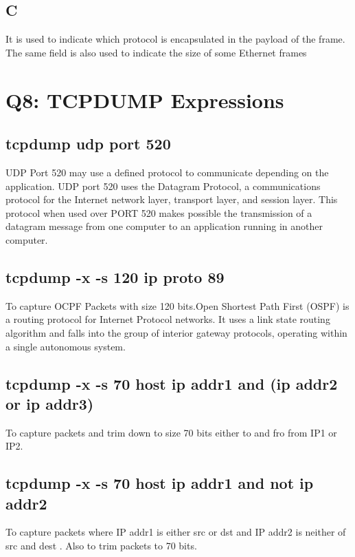 \documentclass{article}
\begin{document}
\subsection{C}
It is used to indicate which protocol is encapsulated in the payload of the frame. The same field is also used to indicate the size of some Ethernet frames

\section{Q8: TCPDUMP Expressions}
\subsection{tcpdump udp port 520}
UDP Port 520 may use a defined protocol to communicate depending on the application. UDP port 520 uses the Datagram Protocol, a communications protocol for the Internet network layer, transport layer, and session layer. This protocol when used over PORT 520 makes possible the transmission of a datagram message from one computer to an application running in another computer.
\subsection{tcpdump -x -s 120 ip proto 89}
To capture OCPF Packets with size 120 bits.Open Shortest Path First (OSPF) is a routing protocol for Internet Protocol networks. It uses a link state routing algorithm and falls into the group of interior gateway protocols, operating within a single autonomous system.
\subsection{tcpdump -x -s 70 host ip addr1 and (ip addr2 or ip addr3)}
To capture packets and trim down to size 70 bits either to and fro from IP1 or IP2.
\subsection{tcpdump -x -s 70 host ip addr1 and not ip addr2}
To capture packets where IP addr1 is either src or dst and IP addr2 is neither of src and dest . Also to trim packets to 70 bits.
\end{document}
